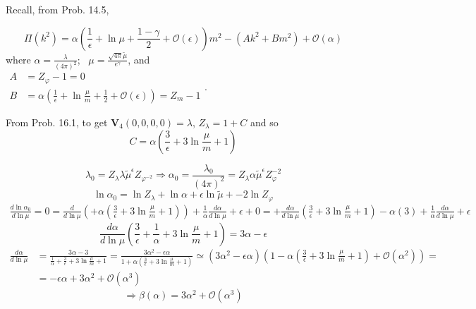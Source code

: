 \documentclass[twoside]{amsart}
\begin{document}
Recall, from Prob. 14.5,

\[
\Pi(k^2) = \alpha \left( \frac{1}{ \epsilon}  + \ln{\mu} + \frac{1 - \gamma}{2}  + \mathcal{O}(\epsilon)  \right) m^2 - (Ak^2 + Bm^2) + \mathcal{O}(\alpha)
\]
where $\alpha = \frac{ \lambda }{ (4\pi)^2}$;  \quad \, $\mu = \frac{ \sqrt{4 \pi } \widetilde{\mu}}{ e^{\gamma}}$,  and  \\
$\begin{aligned} 
 A & = Z_{\varphi} - 1 = 0 \\ 
 B & = \alpha \left( \frac{1}{ \epsilon } + \ln{ \frac{ \mu}{ m }} + \frac{1}{2} + \mathcal{O}(\epsilon) \right) = Z_m - 1
\end{aligned}$.  

From Prob. 16.1, to get $\mathbf{V}_4(0,0,0,0) = \lambda$, $Z_{\lambda} = 1 + C$ and so
\[
C = \alpha \left( \frac{3}{\epsilon} + 3\ln{ \frac{\mu}{m} } + 1 \right)
\]

\[
\lambda_0 = Z_{\lambda} \lambda \widetilde{\mu}^{\epsilon} Z_{\varphi^{-2}} \Longrightarrow \alpha_0 = \frac{ \lambda_0}{ (4\pi)^2} = Z_{\lambda } \alpha \widetilde{\mu}^{\epsilon} Z_{\varphi}^{-2}
\]
\[
\ln{ \alpha_0} = \ln{Z_{\lambda}} + \ln{\alpha}+ \epsilon \ln{ \widetilde{\mu}} + - 2 \ln{ Z_{\varphi}}
\]
\[
\begin{aligned}
  \frac{d \ln{ \alpha_0} }{ d\ln{ \mu} }  = 0  = \frac{d}{d\ln{\mu}} ( + \alpha \left( \frac{3}{ \epsilon } + 3\ln{ \frac{\mu}{m} } + 1 \right) ) + \frac{ 1 }{ \alpha} \frac{d\alpha}{ d\ln{ \mu} } + \epsilon + 0  = + \frac{d\alpha}{ d\ln{ \mu }} \left( \frac{3}{\epsilon } + 3 \ln{ \frac{ \mu}{ m}} + 1 \right) - \alpha(3) + \frac{1}{ \alpha} \frac{d\alpha}{ d\ln{ \mu} } + \epsilon 
\end{aligned}
\]
\[
\frac{d\alpha}{ d\ln{ \mu}} \left(  \frac{3}{\epsilon} + \frac{1}{ \alpha} + 3 \ln{ \frac{\mu}{m}} + 1 \right) =3 \alpha - \epsilon 
\]
\[
\begin{aligned}
  \frac{d\alpha}{ d\ln{\mu}} & = \frac{3\alpha - 3}{ \frac{1}{ \alpha} + \frac{3}{\epsilon}  + 3\ln{ \frac{\mu}{m}} + 1 } = \frac{ 3\alpha^2 - \epsilon \alpha}{ 1 + \alpha \left( \frac{3}{\epsilon } + 3\ln{ \frac{\mu}{m} } + 1 \right) }  \simeq (3\alpha^2 - \epsilon \alpha) ( 1 - \alpha \left( \frac{3}{\epsilon} + 3 \ln{ \frac{\mu}{m}} + 1 \right) + \mathcal{O}(\alpha^2) ) = \\
   & = - \epsilon \alpha + 3\alpha^2 + \mathcal{O}(\alpha^3)
\end{aligned}
\]
\[
\Longrightarrow \boxed{ \beta(\alpha) = 3\alpha^2 + \mathcal{O}(\alpha^3) }
\]
\end{document}
